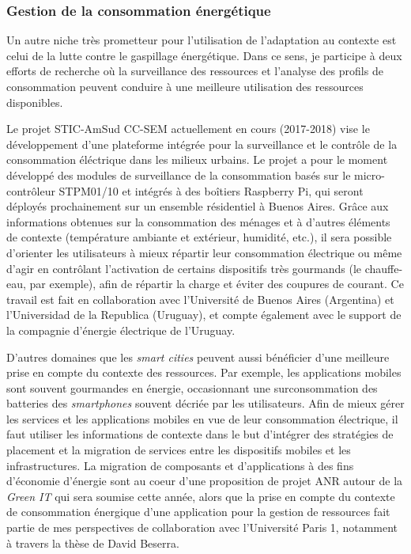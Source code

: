 \subsubsection*{Gestion de la consommation énergétique}

Un autre niche très prometteur pour l'utilisation de l'adaptation au contexte est celui de la lutte contre le gaspillage énergétique. Dans ce sens, je participe à deux efforts de recherche où la surveillance des ressources et l'analyse des profils de consommation peuvent conduire à une meilleure utilisation des ressources disponibles.

Le projet STIC-AmSud CC-SEM actuellement en cours (2017-2018) vise le développement d'une plateforme intégrée pour la surveillance et le contrôle de la consommation éléctrique dans les milieux urbains. Le projet a pour le moment développé des modules de surveillance de la consommation basés sur le micro-contrôleur STPM01/10 et intégrés à des boîtiers Raspberry Pi, qui seront déployés prochainement sur un ensemble résidentiel à Buenos Aires. Grâce aux informations obtenues sur la consommation des ménages et à d'autres éléments de contexte (température ambiante et extérieur, humidité, etc.), il sera possible d'orienter les utilisateurs à mieux répartir leur consommation électrique ou même d'agir en contrôlant l'activation de certains dispositifs très gourmands (le chauffe-eau, par exemple), afin de répartir la charge et éviter des coupures de courant.  Ce travail est fait en collaboration avec l'Université de Buenos Aires (Argentina) et l'Universidad de la Republica (Uruguay), et  compte également avec le support de la compagnie d'énergie électrique de l'Uruguay.

D'autres domaines que les \textit{smart cities} peuvent aussi bénéficier d'une meilleure prise en compte du contexte des ressources. Par exemple, les applications mobiles sont souvent gourmandes en énergie, occasionnant une surconsommation des batteries des \textit{smartphones} souvent décriée par les utilisateurs. Afin de mieux gérer les services et les applications mobiles en vue de leur consommation électrique, il faut utiliser les informations de contexte dans le but d'intégrer des stratégies de placement et la migration de services entre les dispositifs mobiles et les infrastructures. La migration de composants et d’applications à des fins d’économie d’énergie sont au c{oe}ur d’une proposition de projet ANR autour de la \textit{Green IT} qui sera soumise cette année, alors que la prise en compte du contexte de consommation énergique d’une application pour la gestion de ressources fait partie de mes perspectives de collaboration avec l’Université Paris 1, notamment à travers la thèse de David Beserra. 





